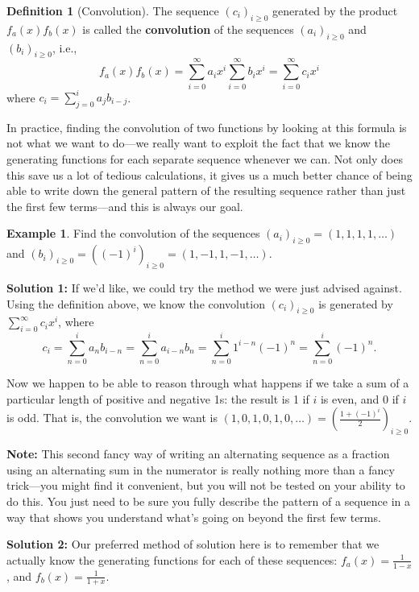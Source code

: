 \documentclass{article}
\theoremstyle{definition}
\newtheorem{definition}{Definition}
\newtheorem{example}{Example}
\begin{document}
\begin{definition}[Convolution]
The sequence $\left(c_{i}\right)_{i \geq 0}$ generated by the product $f_{a}(x) f_{b}(x)$ is called the \textbf{convolution} of the sequences $\left(a_{i}\right)_{i \geq 0}$ and $\left(b_{i}\right)_{i \geq 0}$, i.e.,
\[f_{a}(x) f_{b}(x)=\sum_{i=0}^{\infty} a_{i} x^{i} \sum_{i=0}^{\infty} b_{i} x^{i}=\sum_{i=0}^{\infty} c_{i} x^{i}\]
where $c_{i}=\sum_{j=0}^{i} a_{j} b_{i-j}$.
\end{definition}

In practice, finding the convolution of two functions by looking at this formula is not what we want to do---we really want to exploit the fact that we know the generating functions for each separate sequence whenever we can. Not only does this save us a lot of tedious calculations, it gives us a much better chance of being able to write down the general pattern of the resulting sequence rather than just the first few terms---and this is always our goal.

\begin{example}
Find the convolution of the sequences $\left(a_{i}\right)_{i \geq 0}=(1,1,1,1, \ldots)$ and $\left(b_{i}\right)_{i \geq 0}=\left((-1)^{i}\right)_{i \geq 0}=(1,-1,1,-1, \ldots)$.
\end{example}

\textbf{Solution 1:} If we'd like, we could try the method we were just advised against. Using the definition above, we know the convolution $\left(c_{i}\right)_{i \geq 0}$ is generated by $\sum_{i=0}^{\infty} c_{i} x^{i}$, where
\[c_{i}=\sum_{n=0}^{i} a_{n} b_{i-n}=\sum_{n=0}^{i} a_{i-n} b_{n}=\sum_{n=0}^{i} 1^{i-n}(-1)^{n}=\sum_{n=0}^{i}(-1)^{n}.\]

Now we happen to be able to reason through what happens if we take a sum of a particular length of positive and negative 1s: the result is 1 if $i$ is even, and 0 if $i$ is odd. That is, the convolution we want is $(1,0,1,0,1,0, \ldots)=\left(\frac{1+(-1)^{i}}{2}\right)_{i \geq 0}$.

\textbf{Note:} This second fancy way of writing an alternating sequence as a fraction using an alternating sum in the numerator is really nothing more than a fancy trick---you might find it convenient, but you will not be tested on your ability to do this. You just need to be sure you fully describe the pattern of a sequence in a way that shows you understand what's going on beyond the first few terms.

\textbf{Solution 2:} Our preferred method of solution here is to remember that we actually know the generating functions for each of these sequences: $f_{a}(x)=\frac{1}{1-x}$, and $f_{b}(x)=\frac{1}{1+x}$.
\end{document}
